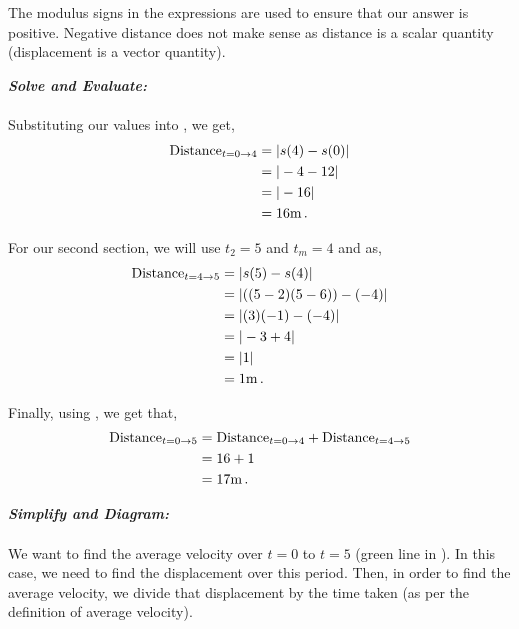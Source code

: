 \begin{subquestions}
\begin{subsubquestions}
\begin{subsubsubquestions}
The modulus signs in the expressions are used to ensure that our answer is positive. Negative distance does not make sense as distance is a scalar quantity (displacement is a vector quantity). 


\textbf{\textit{Solve and Evaluate:}} \\ \\
Substituting our values into , we get,
\begin{align}
	\text{Distance}_{t=0 \rightarrow 4} & = |s(4)-s(0)| \nonumber \\
							& = |-4-12| \nonumber \\
	                        & = |-16| \nonumber \\
	                        & = 16 \text{m} \,.
\end{align}

For our second section, we will use $t_2=5$ and $t_m=4$ and  as,
\begin{align}
	\text{Distance}_{t=4 \rightarrow 5} & = |s(5)-s(4)| \nonumber \\
	& = |((5-2)(5-6)) -(-4)| \nonumber \\
	& = |(3)(-1)-(-4)| \nonumber \\
	& = |-3+4| \nonumber \\
	& = |1| \nonumber \\
	& = 1 \text{m} \,.
\end{align}

Finally, using , we get that,
\begin{align}
	\text{Distance}_{t=0 \rightarrow 5} & = \text{Distance}_{t=0 \rightarrow 4} + \text{Distance}_{t=4 \rightarrow 5} \nonumber \\
	                        & = 16 + 1 \nonumber \\
	                        & = 17 \text{m} \,.
\end{align}


\subsubsubquestion

\textbf{\textit{Simplify and Diagram:}} \\ \\
We want to find the average velocity over $t=0$ to $t=5$ (green line in ). In this case, we need to find the displacement over this period. Then, in order to find the average velocity, we divide that displacement by the time taken (as per the definition of average velocity). \\


\end{subsubsubquestions}
\end{subsubquestions}
\end{subquestions}
